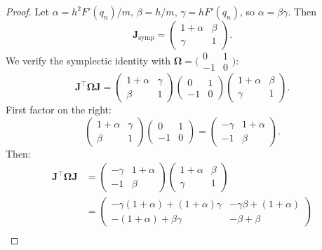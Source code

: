\documentclass[11pt]{article}
\newcommand{\J}{\mathbf{J}}          %
\newcommand{\Omg}{\boldsymbol{\Omega}} %
\begin{document}
\begin{proof}
  Let $\alpha = h^2 F'(q_n)/m$, $\beta = h/m$, $\gamma = h F'(q_n)$,
  so $\alpha = \beta\gamma$.  Then
  \[
    \J_{\mathrm{symp}} =
    \begin{pmatrix} 1+\alpha & \beta \\ \gamma & 1 \end{pmatrix}.
  \]
  We verify the symplectic identity with $\Omg = \bigl(\begin{smallmatrix}0 &
  1 \\ -1 & 0\end{smallmatrix}\bigr)$:
  \[
    \J^{\top}\Omg\J
    = \begin{pmatrix} 1+\alpha & \gamma \\ \beta & 1 \end{pmatrix}
      \begin{pmatrix} 0 & 1 \\ -1 & 0 \end{pmatrix}
      \begin{pmatrix} 1+\alpha & \beta \\ \gamma & 1 \end{pmatrix}.
  \]
  First factor on the right:
  \[
    \begin{pmatrix} 1+\alpha & \gamma \\ \beta & 1 \end{pmatrix}
    \begin{pmatrix} 0 & 1 \\ -1 & 0 \end{pmatrix}
    =
    \begin{pmatrix} -\gamma & 1+\alpha \\ -1 & \beta \end{pmatrix}.
  \]
  Then:
  \begin{align*}
    \J^{\top}\Omg\J
    &=
    \begin{pmatrix} -\gamma & 1+\alpha \\ -1 & \beta \end{pmatrix}
    \begin{pmatrix} 1+\alpha & \beta \\ \gamma & 1 \end{pmatrix} \\
    &=
    \begin{pmatrix}
      -\gamma(1+\alpha) + (1+\alpha)\gamma & -\gamma\beta + (1+\alpha) \\
      -(1+\alpha) + \beta\gamma & -\beta + \beta
    \end{pmatrix} \\

\end{align*}
\end{proof}
\end{document}
